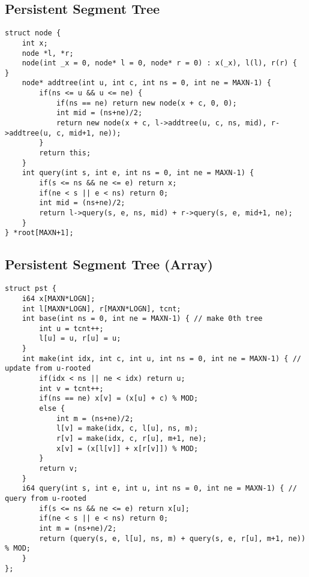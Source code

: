 \documentclass[landscape, 8pt, a4paper, oneside, twocolumn]{extarticle}
\begin{document}
\subsection {Persistent Segment Tree}
\begin{verbatim}
struct node {
	int x;
	node *l, *r;
	node(int _x = 0, node* l = 0, node* r = 0) : x(_x), l(l), r(r) {  }
	node* addtree(int u, int c, int ns = 0, int ne = MAXN-1) {
		if(ns <= u && u <= ne) {
			if(ns == ne) return new node(x + c, 0, 0);
			int mid = (ns+ne)/2;
			return new node(x + c, l->addtree(u, c, ns, mid), r->addtree(u, c, mid+1, ne));
		}
		return this;
	}
	int query(int s, int e, int ns = 0, int ne = MAXN-1) {
		if(s <= ns && ne <= e) return x;
		if(ne < s || e < ns) return 0;
		int mid = (ns+ne)/2;
		return l->query(s, e, ns, mid) + r->query(s, e, mid+1, ne);
	}
} *root[MAXN+1];
\end{verbatim}
\subsection {Persistent Segment Tree (Array)}
\begin{verbatim}
struct pst {
	i64 x[MAXN*LOGN];
	int l[MAXN*LOGN], r[MAXN*LOGN], tcnt;
	int base(int ns = 0, int ne = MAXN-1) { // make 0th tree
		int u = tcnt++;
		l[u] = u, r[u] = u;
	}
	int make(int idx, int c, int u, int ns = 0, int ne = MAXN-1) { // update from u-rooted
		if(idx < ns || ne < idx) return u;
		int v = tcnt++;
		if(ns == ne) x[v] = (x[u] + c) % MOD;
		else {
			int m = (ns+ne)/2;
			l[v] = make(idx, c, l[u], ns, m);
			r[v] = make(idx, c, r[u], m+1, ne);
			x[v] = (x[l[v]] + x[r[v]]) % MOD;
		}
		return v;
	}
	i64 query(int s, int e, int u, int ns = 0, int ne = MAXN-1) { // query from u-rooted
		if(s <= ns && ne <= e) return x[u];
		if(ne < s || e < ns) return 0;
		int m = (ns+ne)/2;
		return (query(s, e, l[u], ns, m) + query(s, e, r[u], m+1, ne)) % MOD; 
	}
};
\end{verbatim}
\end{document}
